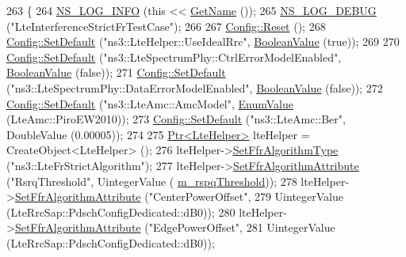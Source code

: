 \begin{DoxyCode}
263 \{
264   \hyperlink{group__logging_gafbd73ee2cf9f26b319f49086d8e860fb}{NS\_LOG\_INFO} (\textcolor{keyword}{this} << \hyperlink{classns3_1_1TestCase_a28f7bb59669c24dae1c290fc17fc9b62}{GetName} ());
265   \hyperlink{group__logging_ga413f1886406d49f59a6a0a89b77b4d0a}{NS\_LOG\_DEBUG} (\textcolor{stringliteral}{"LteInterferenceStrictFrTestCase"});
266 
267   \hyperlink{group__config_ga2c1b65724f42f8c72276d7e7ad6df6db}{Config::Reset} ();
268   \hyperlink{group__config_ga2e7882df849d8ba4aaad31c934c40c06}{Config::SetDefault} (\textcolor{stringliteral}{"ns3::LteHelper::UseIdealRrc"}, 
      \hyperlink{classns3_1_1BooleanValue}{BooleanValue} (\textcolor{keyword}{true}));
269 
270   \hyperlink{group__config_ga2e7882df849d8ba4aaad31c934c40c06}{Config::SetDefault} (\textcolor{stringliteral}{"ns3::LteSpectrumPhy::CtrlErrorModelEnabled"}, 
      \hyperlink{classns3_1_1BooleanValue}{BooleanValue} (\textcolor{keyword}{false}));
271   \hyperlink{group__config_ga2e7882df849d8ba4aaad31c934c40c06}{Config::SetDefault} (\textcolor{stringliteral}{"ns3::LteSpectrumPhy::DataErrorModelEnabled"}, 
      \hyperlink{classns3_1_1BooleanValue}{BooleanValue} (\textcolor{keyword}{false}));
272   \hyperlink{group__config_ga2e7882df849d8ba4aaad31c934c40c06}{Config::SetDefault} (\textcolor{stringliteral}{"ns3::LteAmc::AmcModel"}, \hyperlink{classns3_1_1EnumValue}{EnumValue} (LteAmc::PiroEW2010));
273   \hyperlink{group__config_ga2e7882df849d8ba4aaad31c934c40c06}{Config::SetDefault} (\textcolor{stringliteral}{"ns3::LteAmc::Ber"}, DoubleValue (0.00005));
274 
275   \hyperlink{classns3_1_1Ptr}{Ptr<LteHelper>} lteHelper = CreateObject<LteHelper> ();
276   lteHelper->\hyperlink{classns3_1_1LteHelper_a035c6b03305c1511975362f80425b5fc}{SetFfrAlgorithmType} (\textcolor{stringliteral}{"ns3::LteFrStrictAlgorithm"});
277   lteHelper->\hyperlink{classns3_1_1LteHelper_a793d56e843a844428851e90752c5f130}{SetFfrAlgorithmAttribute} (\textcolor{stringliteral}{"RsrqThreshold"}, UintegerValue (
      \hyperlink{classLteInterferenceStrictFrTestCase_a114a0478eab1d57168b018eb23c9cfba}{m\_rspqThreshold}));
278   lteHelper->\hyperlink{classns3_1_1LteHelper_a793d56e843a844428851e90752c5f130}{SetFfrAlgorithmAttribute} (\textcolor{stringliteral}{"CenterPowerOffset"},
279                                        UintegerValue (LteRrcSap::PdschConfigDedicated::dB0));
280   lteHelper->\hyperlink{classns3_1_1LteHelper_a793d56e843a844428851e90752c5f130}{SetFfrAlgorithmAttribute} (\textcolor{stringliteral}{"EdgePowerOffset"},
281                                        UintegerValue (LteRrcSap::PdschConfigDedicated::dB0));

\end{DoxyCode}
